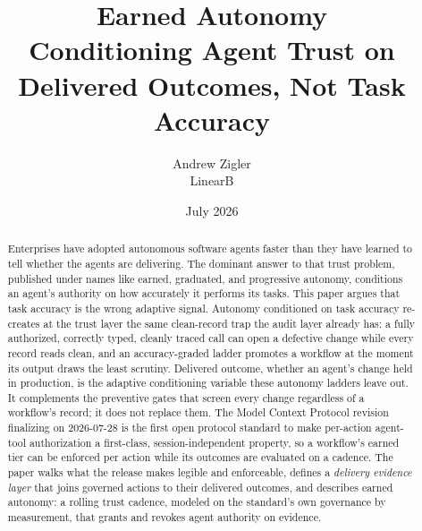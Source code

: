 \documentclass[11pt]{article}
\title{\vspace{-1.2em}\textbf{Earned Autonomy}\\[0.35em]
  \large Conditioning Agent Trust on Delivered Outcomes, Not Task Accuracy}
\author{Andrew Zigler \\ \large LinearB}
\date{July 2026}
\begin{document}
\maketitle

\begin{abstract}
\noindent Enterprises have adopted autonomous software agents faster than they
have learned to tell whether the agents are delivering. The dominant answer to
that trust problem, published under names like earned, graduated, and
progressive autonomy, conditions an agent's authority on how accurately it
performs its tasks. This paper argues that task accuracy is the wrong adaptive
signal. Autonomy conditioned on task accuracy re-creates at the trust layer the
same clean-record trap the audit layer already has: a fully authorized,
correctly typed, cleanly traced call can open a defective change while every
record reads clean, and an accuracy-graded ladder promotes a workflow at the
moment its output draws the least scrutiny. Delivered outcome, whether an
agent's change held in production, is the adaptive conditioning variable these
autonomy ladders leave out. It complements the preventive gates that screen
every change regardless of a workflow's record; it does not replace them. The
Model Context Protocol revision finalizing on 2026-07-28 is the first open
protocol standard to make per-action agent-tool authorization a first-class,
session-independent property, so a workflow's earned tier can be enforced per
action while its outcomes are evaluated on a cadence. The paper walks what the
release makes legible and enforceable, defines a \emph{delivery evidence layer}
that joins governed actions to their delivered outcomes, and describes earned
autonomy: a rolling trust cadence, modeled on the standard's own governance by
measurement, that grants and revokes agent authority on evidence.
\end{abstract}










\end{document}
